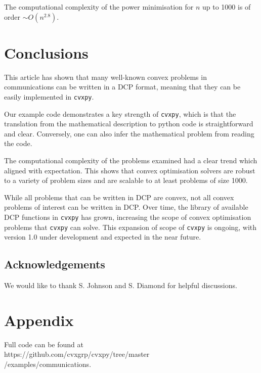 \documentclass[twocolumn,secnumarabic,amssymb, nobibnotes, aps, prl,superscriptaddress]{revtex4-1}
\begin{document}
The computational complexity of the power minimisation for $n$ up to 1000 is of order $\sim O(n^{2.8})$.

\section{Conclusions}
This article has shown that many well-known convex problems in communications can be written in a DCP format, meaning that they can be easily implemented in \texttt{cvxpy}.

Our example code demonstrates a key strength of \texttt{cvxpy}, which is that the translation from the mathematical description to python code is straightforward and clear.  Conversely, one can also infer the mathematical problem from reading the code.

The computational complexity of the problems examined had a clear trend which aligned with expectation.  This shows that convex optimisation solvers are robust to a variety of problem sizes and are scalable to at least problems of size 1000.

While all problems that can be written in DCP are convex, not all convex problems of interest can be written in DCP.  Over time, the library of available DCP functions in \texttt{cvxpy} has grown, increasing the scope of convex optimisation problems that \texttt{cvxpy} can solve.  This expansion of scope of \texttt{cvxpy} is ongoing, with version 1.0 under development and expected in the near future.


\subsection*{Acknowledgements}
We would like to thank S. Johnson and S. Diamond for helpful discussions.

\section*{Appendix}
Full code can be found at\\ https://github.com/cvxgrp/cvxpy/tree/master\\/examples/communications.

\vspace{1cm}
 


\end{document}
